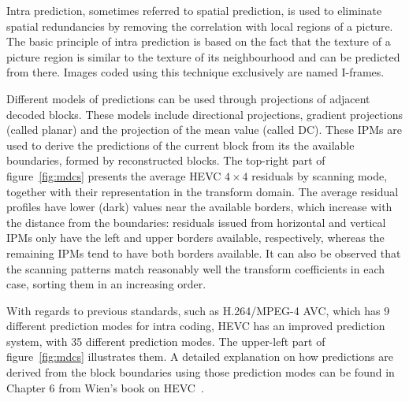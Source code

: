 \documentclass[11pt,a4paper,openright,twoside]{book}
\numberwithin{equation}{section} %
\numberwithin{figure}{section} %
\numberwithin{table}{section} %
\begin{document}
Intra prediction, sometimes referred to spatial prediction, is used to
eliminate spatial redundancies by removing the correlation with local regions
of a picture.
The basic principle of intra prediction is based on the fact that the texture
of a picture region is similar to the texture of its neighbourhood and can be
predicted from there.
Images coded using this technique exclusively are named I-frames.

Different models of predictions can be used through projections of adjacent
decoded blocks.
These models include directional projections, gradient projections (called
planar) and the projection of the mean value (called DC).
These \acp{IPM} are used to derive the predictions of the current block from
its the available boundaries, formed by reconstructed blocks.
The top-right part of figure~\ref{fig:mdcs} presents the average
\ac{HEVC} $4\times4$ residuals by scanning mode, together with their
representation in the transform domain.
The average residual profiles have lower (dark) values near the
available borders, which increase with the distance from the
boundaries: residuals issued from horizontal and vertical \acp{IPM} only
have the left and upper borders available, respectively, whereas the
remaining \acp{IPM} tend to have both borders available.
It can also be observed that the scanning patterns match reasonably well
the transform coefficients in each case, sorting them in an increasing
order.

With regards to previous standards, such as H.264/\ac{MPEG}-4 \ac{AVC}, which
has 9 different prediction modes for intra coding, \ac{HEVC} has an improved
prediction system, with 35 different prediction modes.
The upper-left part of figure~\ref{fig:mdcs} illustrates them.
A detailed explanation on how predictions are derived from the block
boundaries using those prediction modes can be found in Chapter 6 from Wien's
book on \ac{HEVC}~\cite{wien-15-hevc}.
\end{document}
